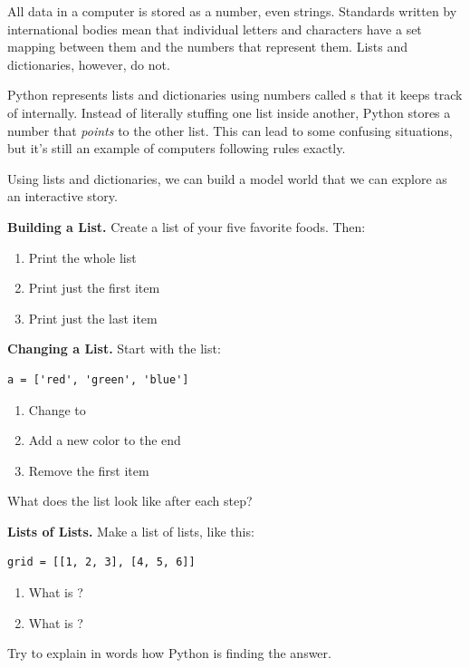 All data in a computer is stored as a number, even strings. Standards written by international
bodies mean that individual letters and characters have a set mapping between them and the numbers
that represent them. Lists and dictionaries, however, do not.

Python represents lists and dictionaries using numbers called s that it keeps track of
internally. Instead of literally stuffing one list inside another, Python stores a number that
\emph{points} to the other list. This can lead to some confusing situations, but it's still an
example of computers following rules exactly.

Using lists and dictionaries, we can build a model world that we can explore as an interactive
story.

\Exercises

\begin{exercises}

\item \textcolor{TermSage}{\bfseries\sffamily Building a List.}
Create a list of your five favorite foods. Then:
\begin{enumerate}
  \item Print the whole list
  \item Print just the first item
  \item Print just the last item
\end{enumerate}

\item \textcolor{TermSage}{\bfseries\sffamily Changing a List.}
Start with the list:
\begin{lstlisting}
a = ['red', 'green', 'blue']
\end{lstlisting}
\begin{enumerate}
  \item Change  to 
  \item Add a new color to the end
  \item Remove the first item
\end{enumerate}
What does the list look like after each step?

\item \textcolor{TermSage}{\bfseries\sffamily Lists of Lists.}
Make a list of lists, like this:
\begin{lstlisting}
grid = [[1, 2, 3], [4, 5, 6]]
\end{lstlisting}
\begin{enumerate}
  \item What is ?
  \item What is ?
\end{enumerate}
Try to explain in words how Python is finding the answer.


\end{exercises}
